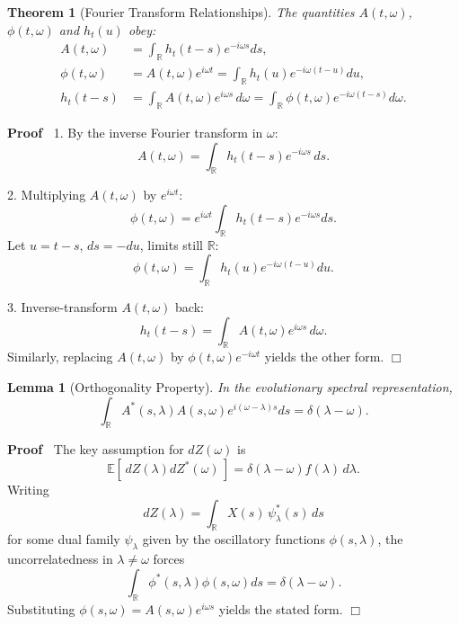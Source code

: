 \documentclass{article}
\newenvironment{proof}{\noindent\textbf{Proof\ }}{\hspace*{\fill}$\Box$\medskip}
\newtheorem{lemma}{Lemma}
\newtheorem{theorem}{Theorem}
\begin{document}
\begin{theorem}
  [Fourier Transform Relationships]
  The quantities $A(t,\omega)$, $\phi(t,\omega)$ and $h_t(u)$ obey:
  \begin{align}
    A(t, \omega) &= \int_{\mathbb{R}} h_t(t - s) e^{- i \omega s} ds, \\
    \phi(t, \omega) &= A(t, \omega) e^{i \omega t} = \int_{\mathbb{R}} h_t(u) e^{- i \omega (t - u)} du, \\
    h_t(t - s) &= \int_{\mathbb{R}} A(t, \omega) e^{i \omega s} \, d\omega 
              = \int_{\mathbb{R}} \phi(t, \omega) e^{- i \omega (t - s)} d \omega.
  \end{align}
\end{theorem}

\begin{proof}
1. By the inverse Fourier transform in $\omega$:
\[
A(t,\omega) = \int_{\mathbb{R}} h_t(t-s) e^{-i\omega s} \, ds.
\]

2. Multiplying $A(t,\omega)$ by $e^{i\omega t}$:
\[
\phi(t,\omega) = e^{i\omega t} \int_{\mathbb{R}} h_t(t-s) e^{-i\omega s} ds.
\]
Let $u = t-s$, $ds = -du$, limits still $\mathbb{R}$:
\[
\phi(t,\omega) = \int_{\mathbb{R}} h_t(u) e^{-i\omega (t-u)} du.
\]

3. Inverse-transform $A(t,\omega)$ back:
\[
h_t(t-s) = \int_{\mathbb{R}} A(t,\omega) e^{i\omega s} \, d\omega.
\]
Similarly, replacing $A(t,\omega)$ by $\phi(t,\omega)e^{-i\omega t}$ yields the other form.
\end{proof}

\begin{lemma}
  [Orthogonality Property]
  In the evolutionary spectral representation,
  \[
  \int_{\mathbb{R}} A^{\ast} (s, \lambda) A (s, \omega) e^{i (\omega-\lambda) s} ds = \delta (\lambda - \omega).
  \]
\end{lemma}

\begin{proof}
The key assumption for $dZ(\omega)$ is
\[
\mathbb{E}[\, dZ(\lambda) dZ^*(\omega) \,] = \delta(\lambda-\omega) f(\lambda) \, d\lambda.
\]
Writing
\[
dZ(\lambda) = \int_{\mathbb{R}} X(s) \, \psi^*_\lambda(s) \, ds
\]
for some dual family $\psi_\lambda$ given by the oscillatory functions $\phi(s,\lambda)$, the uncorrelatedness in $\lambda\neq\omega$ forces
\[
\int_{\mathbb{R}} \phi^*(s,\lambda) \phi(s,\omega) ds = \delta(\lambda-\omega).
\]
Substituting $\phi(s,\omega) = A(s,\omega)e^{i\omega s}$ yields the stated form.
\end{proof}
\end{document}
